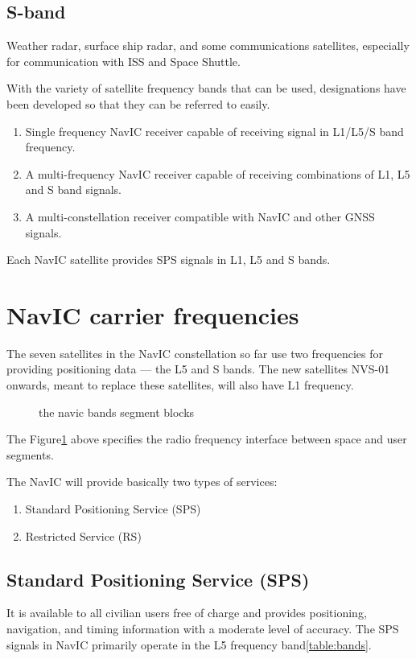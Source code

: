 \subsection{S-band}
Weather radar, surface ship radar, and some communications satellites, especially for communication with ISS and Space Shuttle. 
	

With the variety of satellite frequency bands that can be used, designations have been developed so that they can be referred to easily. 
\begin{enumerate}
	\item Single frequency NavIC receiver capable of receiving signal in L1/L5/S band frequency.
	\item A multi-frequency NavIC receiver capable of receiving combinations of L1, L5 and S band signals.
	\item A multi-constellation receiver compatible with NavIC and other GNSS signals.
\end{enumerate}


Each NavIC satellite provides SPS signals in L1, L5 and S bands.

\section{NavIC carrier frequencies}	
The seven satellites in the NavIC constellation so far use two frequencies for providing positioning data — the L5 and S bands. The new satellites NVS-01 onwards, meant to replace these satellites, will also have L1 frequency.


	\begin{figure}[!ht]
	\centering
	
	\caption{the navic bands segment blocks}
	\label{figs:bandsfig}
	\end{figure}

The Figure\ref{figs:bandsfig} above specifies the radio frequency interface between space and user segments.

The NavIC will provide basically two types of services:
	\begin{enumerate}
	\item Standard Positioning Service (SPS)
	\item Restricted Service (RS)
	\end{enumerate}

		

\subsection{Standard Positioning Service (SPS)}
	It is available to all civilian users free of charge and provides positioning, navigation, and timing information with a moderate level of accuracy. The SPS signals in NavIC primarily operate in the L5 frequency band\ref{table:bands}.
